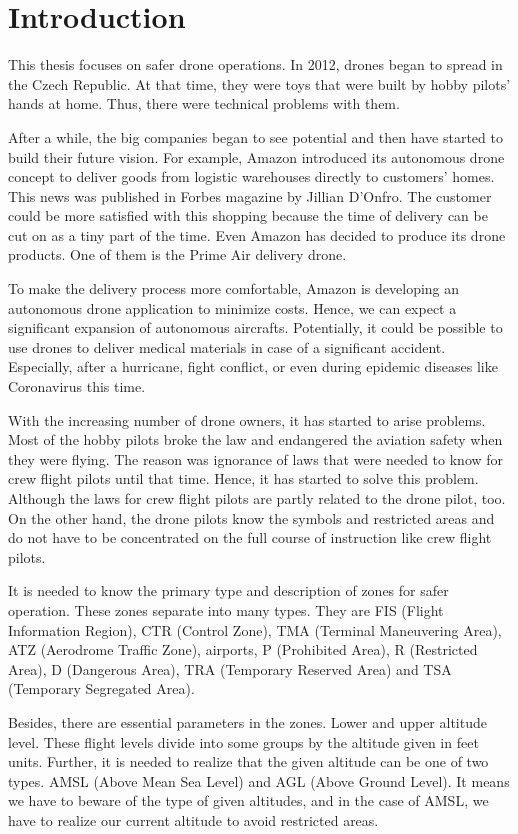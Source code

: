 \chapter{Introduction}\label{ch:introduction}
This thesis focuses on safer drone operations.
In 2012, drones began to spread in the Czech Republic.
At that time, they were toys that were built by hobby pilots' hands at home.
Thus, there were technical problems with them.

After a while, the big companies began to see potential and then have started to build their future vision.
For example, Amazon introduced its autonomous drone concept to deliver goods from logistic warehouses directly to customers’ homes.
This news was published in Forbes magazine by Jillian D'Onfro.\cite{amazonArticle}
The customer could be more satisfied with this shopping because the time of delivery can be cut on as a tiny part of the time.
Even Amazon has decided to produce its drone products.
One of them is the Prime Air delivery drone.

To make the delivery process more comfortable, Amazon is developing an autonomous drone application to minimize costs.
Hence, we can expect a significant expansion of autonomous aircrafts.
Potentially, it could be possible to use drones to deliver medical materials in case of a significant accident.
Especially, after a hurricane, fight conflict, or even during epidemic diseases like Coronavirus this time.

With the increasing number of drone owners, it has started to arise problems.
Most of the hobby pilots broke the law and endangered the aviation safety when they were flying.
The reason was ignorance of laws that were needed to know for crew flight pilots until that time.
Hence, it has started to solve this problem.
Although the laws for crew flight pilots are partly related to the drone pilot, too.
On the other hand, the drone pilots know the symbols and restricted areas and do not have to be concentrated on the full course of instruction like crew flight pilots.


It is needed to know the primary type and description of zones for safer operation.
These zones separate into many types.
They are FIS (Flight Information Region), CTR (Control Zone), TMA (Terminal Maneuvering Area), ATZ (Aerodrome Traffic Zone), airports, P (Prohibited Area), R (Restricted Area), D (Dangerous Area), TRA (Temporary Reserved Area) and TSA (Temporary Segregated Area).\cite{airspace}

Besides, there are essential parameters in the zones.
Lower and upper altitude level.
These flight levels divide into some groups by the altitude given in feet units.
Further, it is needed to realize that the given altitude can be one of two types.
AMSL (Above Mean Sea Level) and AGL (Above Ground Level).
It means we have to beware of the type of given altitudes, and in the case of AMSL, we have to realize our current altitude to avoid restricted areas.


